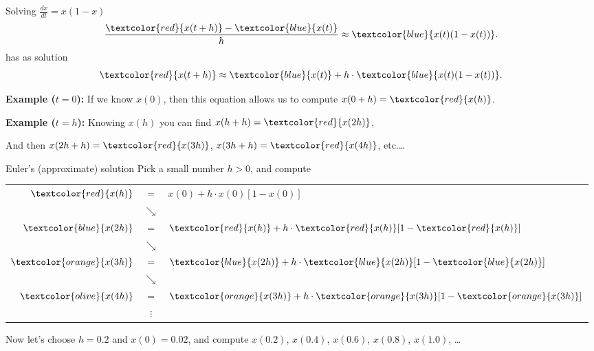 \documentclass{beamer}
\begin{document}
\begin{frame}{Solving $\frac{dx} {dt} = x(1-x)$}
  \[
  \frac{ \textcolor{red}{x(t+h)} - \textcolor{blue}{x(t)} } {h}
  \approx \textcolor{blue}{x(t)(1-x(t))}.
  \]
  has as solution
  \[
  \textcolor{red}{x(t+h)}\approx
  \textcolor{blue}{x(t)} + h\cdot \textcolor{blue}{x(t)(1-x(t))}.
  \]
  \pause

  \textbf{Example ($t=0$): }
  If we know $x(0)$, then this equation allows us to compute $x(0+h) =
  \textcolor{red}{x(h)}$.\pause

  \textbf{Example ($t=h$): }
  Knowing $x(h)$ you can find $x(h+h) = \textcolor{red}{x(2h)}$\pause,

  And then $x(2h+h) = \textcolor{red}{x(3h)}$, \pause
  $x(3h+h) = \textcolor{red}{x(4h)}$, etc.\ldots
\end{frame}

\begin{frame}{Euler's (approximate) solution}
  Pick a small number $h>0$, and compute
  \begin{center}
    \begin{tabular}[h]{rcl}
      $\textcolor{red}{x(h)}$& $=$ & $x(0) + h\cdot
      x(0)[1-x(0)]$\pause\\
      &$\searrow$\\
      $\textcolor{blue}{x(2h)}$&$=$ & $ \textcolor{red}{x(h)} + h\cdot
      \textcolor{red}{x(h)}[1-\textcolor{red}{x(h)}]$\pause\\ 
      &$\searrow$\\
      $\textcolor{orange}{x(3h)}$&$=$ & $\textcolor{blue}{x(2h)} + h\cdot
      \textcolor{blue}{x(2h)}[1-\textcolor{blue}{x(2h)}]$\pause\\ 
      &$\searrow$\\
      $\textcolor{olive}{x(4h)}$&$=$ & $ \textcolor{orange}{x(3h)} + h\cdot
      \textcolor{orange}{x(3h)}[1-\textcolor{orange}{x(3h)}]$\pause\\ 
      &$\vdots$
    \end{tabular}
  \end{center}
  \pause%
  Now let's choose $h=0.2$ and $x(0) = 0.02$, and compute $x(0.2)$,
  $x(0.4)$, $x(0.6)$, $x(0.8)$, $x(1.0)$,  \ldots
\end{frame}
\end{document}

